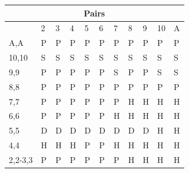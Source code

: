 \documentclass[conference]{IEEEtran}
\begin{document}
\begin{table}[ht]
\begin{tabular}{|l|l|l|l|l|l|l|l|l|l|l|}
\multicolumn{11}{|c|}{\textbf{Pairs}}                                 \\ \hline
                             & 2 & 3 & 4 & 5 & 6 & 7 & 8 & 9 & 10 & A \\ \hline
A,A                          & \cellcolor{yellow!75}P & \cellcolor{yellow!75}P & \cellcolor{yellow!75}P & \cellcolor{yellow!75}P & \cellcolor{yellow!75}P & \cellcolor{yellow!75}P & \cellcolor{yellow!75}P & \cellcolor{yellow!75}P & \cellcolor{yellow!75}P & \cellcolor{yellow!75}P  \\ \hline
10,10                        & \cellcolor{red!75}S & \cellcolor{red!75}S & \cellcolor{red!75}S & \cellcolor{red!75}S & \cellcolor{red!75}S & \cellcolor{red!75}S & \cellcolor{red!75}S & \cellcolor{red!75}S & \cellcolor{red!75}S & \cellcolor{red!75}S  \\ \hline
9,9                          & \cellcolor{yellow!75}P & \cellcolor{yellow!75}P & \cellcolor{yellow!75}P & \cellcolor{yellow!75}P & \cellcolor{yellow!75}P & \cellcolor{red!75}S & \cellcolor{yellow!75}\cellcolor{yellow!75}P & \cellcolor{yellow!75}P & \cellcolor{red!75}S & \cellcolor{red!75}S  \\ \hline
8,8                          & \cellcolor{yellow!75}P & \cellcolor{yellow!75}P & \cellcolor{yellow!75}P & \cellcolor{yellow!75}P & \cellcolor{yellow!75}P & \cellcolor{yellow!75}P & \cellcolor{yellow!75}P & \cellcolor{yellow!75}P & \cellcolor{yellow!75}P & \cellcolor{yellow!75}P  \\ \hline
7,7                          & \cellcolor{yellow!75}P & \cellcolor{yellow!75}P & \cellcolor{yellow!75}P & \cellcolor{yellow!75}P & \cellcolor{yellow!75}P & \cellcolor{yellow!75}P & \cellcolor{green!50}H & \cellcolor{green!50}H & \cellcolor{green!50}H & \cellcolor{green!50}H  \\ \hline
6,6                           & \cellcolor{yellow!75}P & \cellcolor{yellow!75}P & \cellcolor{yellow!75}P & \cellcolor{yellow!75}P & \cellcolor{yellow!75}P & \cellcolor{green!50}H & \cellcolor{green!50}H & \cellcolor{green!50}H & \cellcolor{green!50}H & \cellcolor{green!50}H  \\ \hline
5,5                          & \cellcolor{blue!25}D & \cellcolor{blue!25}D & \cellcolor{blue!25}D & \cellcolor{blue!25}D & \cellcolor{blue!25}D & \cellcolor{blue!25}D & \cellcolor{blue!25}D & \cellcolor{blue!25}D & \cellcolor{green!50}H & \cellcolor{green!50}H  \\ \hline
4,4                          & \cellcolor{green!50}H & \cellcolor{green!50}H & \cellcolor{green!50}H & \cellcolor{yellow!75}P & \cellcolor{yellow!75}P & \cellcolor{green!50}H & \cellcolor{green!50}H & \cellcolor{green!50}H & \cellcolor{green!50}H & \cellcolor{green!50}H  \\ \hline
2,2-3,3                      & \cellcolor{yellow!75}P & \cellcolor{yellow!75}P & \cellcolor{yellow!75}P & \cellcolor{yellow!75}P & \cellcolor{yellow!75}P & \cellcolor{yellow!75}P & \cellcolor{green!50}H & \cellcolor{green!50}H & \cellcolor{green!50}H & \cellcolor{green!50}H  \\ \hline
\end{tabular}
\end{table}
\end{document}
